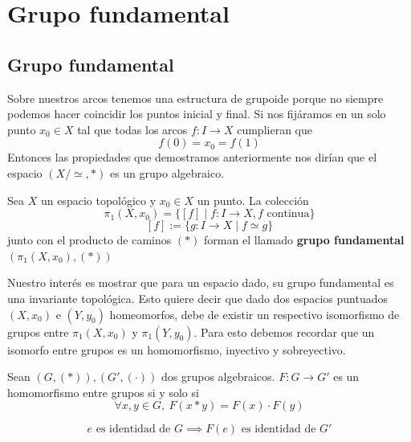 \section{Grupo fundamental}

{
\newcommand{\homRelAlt}{\stackrel{.}{\simeq}}



\subsection{Grupo fundamental}
Sobre nuestros arcos tenemos una estructura de grupoide porque no siempre
podemos hacer coincidir los puntos inicial y final. Si nos fijáramos en
un solo punto \(x_0 \in X\) tal que todas los arcos \(f : I \to X\)
cumplieran que
\[ f(0) = x_0 = f (1) \]
Entonces las propiedades que demostramos anteriormente nos dirían que el
espacio \((X / \simeq, *)\) es un grupo algebraico.
\begin{definicion}
  Sea \(X\) un espacio topológico y \(x_0 \in X\) un punto. La colección
  \[ \pi_1 (X,x_0) = \{ [f] \mid f : I \to X, f \text{ continua}\}\]
  \[ [f] := \{ g : I \to X \mid f \simeq g\}\]
  junto con el producto de caminos \((*)\) forman el llamado
  \textbf{grupo fundamental} \((\pi_1(X,x_0), (*))\)
\end{definicion}

Nuestro interés es mostrar que para un espacio dado, su grupo
fundamental es una invariante topológica. Esto quiere decir que dado dos
espacios puntuados \((X,x_0)\) e \((Y,y_0)\) homeomorfos, debe de
existir un respectivo isomorfismo de grupos entre \(\pi_1(X,x_0)\) y
\(\pi_1(Y,y_0)\). Para esto debemos recordar que un isomorfo entre
grupos es un homomorfismo, inyectivo y sobreyectivo.
\begin{definicion}
  Sean \((G,(*)), (G', (\cdot))\) dos grupos algebraicos. \(F : G \to
  G'\) es un homomorfismo entre grupos si y solo si
  \[ \forall x,y \in G,\ F (x * y) = F(x) \cdot F(y)\]
\end{definicion}
\begin{corolario}
  \[ e \text{ es identidad de } G \implies F(e) \text { es identidad de } G' \]
\end{corolario}

}
